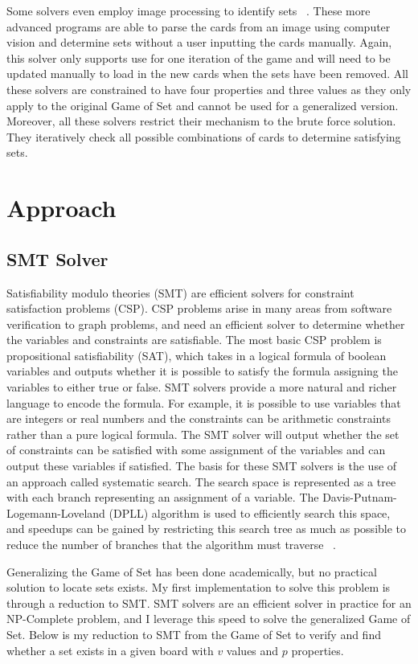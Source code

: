 \documentclass[pageno]{jpaper}
\begin{document}
Some solvers even employ image processing to identify sets ~\cite{jorquera}. These more advanced programs are able to parse the cards from an image using computer vision and determine sets without a user inputting the cards manually. Again, this solver only supports use for one iteration of the game and will need to be updated manually to load in the new cards when the sets have been removed. All these solvers are constrained to have four properties and three values as they only apply to the original Game of Set and cannot be used for a generalized version. Moreover, all these solvers restrict their mechanism to the brute force solution. They iteratively check all possible combinations of cards to determine satisfying sets.


\section{Approach}

\subsection{SMT Solver}
Satisfiability modulo theories (SMT) are efficient solvers for constraint satisfaction problems (CSP). CSP problems arise in many areas from software verification to graph problems, and need an efficient solver to determine whether the variables and constraints are satisfiable. The most basic CSP problem is propositional satisfiability (SAT), which takes in a logical formula of boolean variables and outputs whether it is possible to satisfy the formula assigning the variables to either true or false. SMT solvers provide a more natural and richer language to encode the formula. For example, it is possible to use variables that are integers or real numbers and the constraints can be arithmetic constraints rather than a pure logical formula. The SMT solver will output whether the set of constraints can be satisfied with some assignment of the variables and can output these variables if satisfied. The basis for these SMT solvers is the use of an approach called systematic search. The search space is represented as a tree with each branch representing an assignment of a variable. The Davis-Putnam-Logemann-Loveland (DPLL) algorithm is used to efficiently search this space, and speedups can be gained by restricting this search tree as much as possible to reduce the number of branches that the algorithm must traverse ~\cite{SMTbackground}.

Generalizing the Game of Set has been done academically, but no practical solution to locate sets exists. My first implementation to solve this problem is through a reduction to SMT. SMT solvers are an efficient solver in practice for an NP-Complete problem, and I leverage this speed to solve the generalized Game of Set. Below is my reduction to SMT from the Game of Set to verify and find whether a set exists in a given board with $v$ values and $p$ properties.
\end{document}
